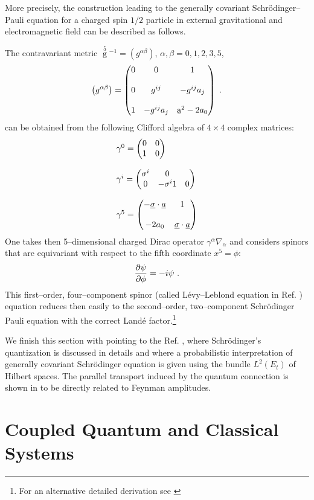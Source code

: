 \documentclass[12pt]{article}
\def\be{\begin{equation}} \def\ee{\end{equation}}
\begin{document}
More precisely,  the construction leading  to the generally
covariant Schr\"{o}\-din\-ger--Pauli equation for a charged spin $1/2$
particle in external gravitational and electromagnetic field can
be described as follows. 

The contravariant metric $\mathop{g}\limits^{5}{}^{-1}
=\left ( g^{\alpha \beta}\right)$, 
$\alpha,  \beta = 0, 1, 2, 3, 5$, 
\be
\left ( g^{\alpha \beta} \right)
= \begin{pmatrix} 0 & 0 & 1 \cr\cr
0 & g^{ij} & -g^{ij}a_{j} \cr\cr
1 & -g^{ij}a_{j} & \b{a}^{2}-2a_{0} 
\end{pmatrix}
\ . 
\ee
can be obtained from the following Clifford algebra of $4\times 4$
complex matrices: 
\be
\begin{array}{l}
\gamma^{0} = \begin{pmatrix}0 & 0 \cr
1 & 0
\end{pmatrix}
\cr\cr
\gamma^{i} = \begin{pmatrix} \sigma^{i} & 0 \cr
0 & - \sigma^{i} 
1 & 0
\end{pmatrix}
\cr\cr
\gamma^{5} = \begin{pmatrix}-\underline{\sigma}\cdot \underline{a} & 1 \cr\cr
 -2a_{0} & \underline{\sigma} \cdot \underline{a}
 \end{pmatrix}
\end{array}
\ee
One takes then 5--dimensional charged Dirac operator $\gamma^{\alpha}
\nabla_{\alpha}$ and considers spinors that are equivariant with
respect to the fifth coordinate $x^{5} = \phi: $
\be
{\partial \psi \over \partial \phi} = - i \psi \ . 
\ee
This first--order,  four--component spinor  (called L\'evy--Leblond
equation in Ref.  \cite{kun}) equation reduces then easily to the
second--order,  two--component Schr\"{o}\-din\-ger Pauli equation
with the correct Land\'e factor.\footnote{For an alternative
detailed derivation see \cite{can} }



We finish this section with pointing to the Ref.  \cite{jamo}, 
where Schr\"{o}din\-ger's quantization is discussed in details and
where a probabilistic interpretation of generally covariant
Schr\"{o}dinger equation is given using the bundle
$L^{2} (E_{t})$ of Hilbert spaces.  The parallel transport induced
by the quantum connection is shown in \cite{jamo} to be directly
related to Feynman amplitudes. 
\section{Coupled Quantum and Classical Systems}
\end{document}
